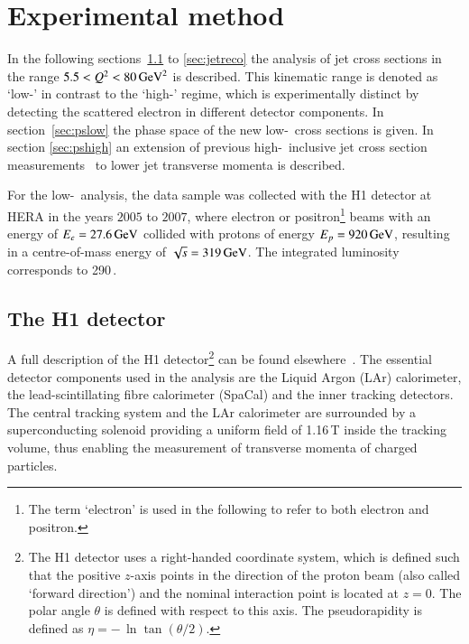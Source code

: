\documentclass[12pt]{article}
\begin{document}
\section{Experimental method}
  In the following sections~\ref{sec:detector} to \ref{sec:jetreco}
  the analysis of jet cross sections 
  in the range $5.5<\Qsq<80\,\GeVsq$ is described.
  This kinematic range is denoted as `low-\Qsq' in contrast to the `high-\Qsq' regime,
  which is experimentally distinct by detecting the scattered electron in different
  detector components.
  In section~\ref{sec:pslow} the phase space of the new low-\Qsq\ cross
  sections is given. In section \ref{sec:pshigh} an extension of
  previous high-\Qsq\ inclusive jet cross section
  measurements~\cite{H1Multijets} to lower jet transverse momenta is
  described.


  For the low-\Qsq\ analysis, the data sample was collected with the H1 detector at HERA in the years $2005$ to $2007$, 
where electron or positron\footnote{The term `electron' 
is used in the following to refer to both electron and positron.} beams with an energy of $E_e = 27.6\,\GeV$
collided with protons of energy $E_p = 920\,\GeV$, resulting in a centre-of-mass energy of $\sqrt{s}=319\,\GeV$.
The integrated luminosity corresponds to 290\,\invpb.

\subsection{The H1 detector}
\label{sec:detector}
A full description of the H1 detector\footnote{The H1 detector uses a right-handed coordinate system, which is defined such that the positive $z$-axis points in the 
direction of the proton beam (also called `forward direction') and the nominal interaction point is located 
at $z = 0$. The polar angle $\theta$ is defined with respect to this axis. The pseudorapidity 
is defined as  $\eta=-\,\ln\tan(\theta/2)$.} can be found elsewhere~\cite{Abt1,Abt2,Appuhn,Andrieu}.  
The essential detector components used in the analysis are 
the Liquid Argon (LAr) calorimeter,
the lead-scintillating fibre calorimeter (SpaCal) 
and the inner tracking detectors.
The  central tracking system and the LAr calorimeter are surrounded by a superconducting solenoid providing a uniform 
field of 1.16\,T inside the tracking volume, thus enabling the measurement of transverse momenta of charged particles.
\end{document}
